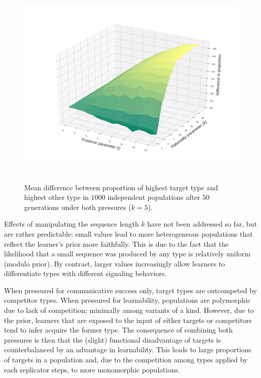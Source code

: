 \documentclass[a4paper, 11pt]{article}
\theoremstyle{Satz}
\begin{document}
\begin{figure}[t]
\centering
\includegraphics[width=1\textwidth,height=10cm,keepaspectratio]{./plots/fig4-3d-incumbents-difference} %
\caption{Mean difference between proportion of highest target type and highest other type in
  $1000$ independent populations after $50$ generations under both pressures ($k = 5$).}
\label{fig:diff}
\end{figure}

Effects of manipulating the sequence length $k$ have not been addressed so far, but are rather
predictable: small values lead to more heterogeneous populations that reflect the learner's
prior more faithfully. This is due to the fact that the likelihood that a small sequence was
produced by any type is relatively uniform (modulo prior). By contrast, larger values
increasingly allow learners to differentiate types with different signaling behaviors.

When pressured for communicative success only, target types are outcompeted by competitor types. When pressured for learnability, populations are polymorphic due to lack of competition; minimally among variants of a kind. However, due to the prior, learners that are exposed to the input of either targets or competitors tend to infer acquire the former type. The consequence of combining both pressures is then that the (slight) functional disadvantage of targets is counterbalanced by an advantage in learnability. This leads to large proportions of targets in a population and, due to the competition among types applied by each replicator steps, to more monomorphic populations. 
\end{document}
